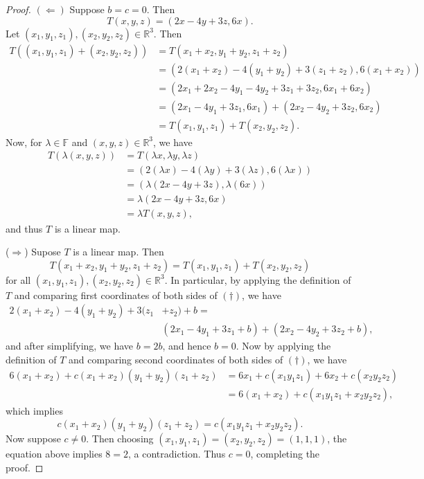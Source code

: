 \documentclass[11pt]{extarticle}
\newcommand{\R}{\mathbb{R}}
\newcommand{\F}{\mathbb{F}}
\begin{document}
\begin{proof}
$(\Leftarrow)$ Suppose $b = c = 0$.  Then
\begin{equation*}
T(x,y,z) = (2x - 4y + 3z, 6x).
\end{equation*}
Let $(x_1,y_1,z_1), (x_2,y_2,z_2)\in\R^3$.  Then 
\begin{align*}
T((x_1,y_1,z_1) + (x_2,y_2,z_2)) &= T(x_1 + x_2, y_1 + y_2, z_1 + z_2)\\
&= (2(x_1 + x_2) - 4(y_1 + y_2) + 3(z_1 + z_2), 6(x_1 + x_2))\\
&= (2x_1 + 2x_2 - 4y_1 - 4y_2 + 3z_1 + 3z_2, 6x_1 + 6x_2)\\
&= (2x_1 - 4y_1 + 3z_1, 6x_1) + (2x_2 - 4y_2 + 3z_2, 6x_2)\\
&= T(x_1, y_1, z_1) + T(x_2, y_2,z_2).
\end{align*}
Now, for $\lambda\in\F$ and $(x,y,z)\in\R^3$, we have
\begin{align*}
T(\lambda(x,y,z)) &= T(\lambda x, \lambda y, \lambda z)\\
&= (2(\lambda x) - 4(\lambda y) + 3(\lambda z), 6(\lambda x))\\
&= (\lambda(2x - 4y + 3z), \lambda(6x))\\
&= \lambda(2x - 4y + 3z, 6x)\\
&= \lambda T(x, y, z),
\end{align*}
and thus $T$ is a linear map.
\par ($\Rightarrow$) Supose $T$ is a linear map.  Then
\begin{equation}\tag{$\dagger$}
T(x_1 + x_2,y_1 + y_2, z_1 + z_2) = T(x_1, y_1, z_1) + T(x_2, y_2, z_2)
\end{equation}
for all $(x_1,y_1,z_1),(x_2, y_2, z_2)\in\R^3$.  In particular, by applying the definition of $T$ and comparing first coordinates of both sides of $(\dagger)$, we have
\begin{align*}
2(x_1 + x_2) - 4(y_1+y_2) + 3(z_1&+ z_2) + b =\\ &(2x_1 - 4y_1 + 3z_1 + b) + (2x_2 - 4y_2 +3z_2 + b),
\end{align*}
and after simplifying, we have $b = 2b$, and hence $b= 0$.  Now by applying the definition of $T$ and comparing second coordinates of both sides of $(\dagger)$, we have
\begin{align*}
6(x_1 + x_2) + c(x_1+x_2)(y_1+y_2)(z_1+z_2) &= 6x_1 + c(x_1y_1z_1) + 6x_2 +  c(x_2y_2z_2)\\
&= 6(x_1 + x_2) + c(x_1y_1z_1 + x_2y_2z_2),
\end{align*}
which implies
\begin{equation*}
c(x_1+x_2)(y_1+y_2)(z_1+z_2)  = c(x_1y_1z_1 + x_2y_2z_2).
\end{equation*}
Now suppose $c\neq 0$.  Then choosing $(x_1,y_1,z_1) = (x_2,y_2,z_2) = (1,1,1)$, the equation above implies $8 = 2$, a contradiction.  Thus $c=0$, completing the proof.
\end{proof}
\end{document}
